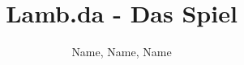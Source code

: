 \documentclass[parskip=full]{scrartcl}
\begin{document}
\title{Lamb.da - Das Spiel}
\author{Name, Name, Name}
\maketitle










\end{document}
